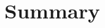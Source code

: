 \documentclass[runnngheads]{book}
\begin{document}
\thispagestyle{empty}
\title{Summary}
%
%

%
\end{document}
